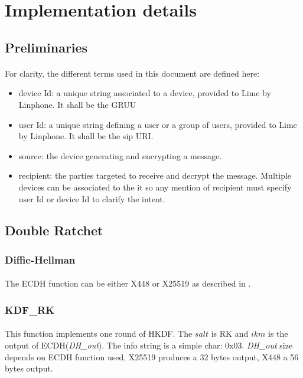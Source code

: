 \documentclass[a4paper,11pt]{article}
\begin{document}
\section{Implementation details}
  \subsection{Preliminaries}
    \paragraph{}For clarity, the different terms used in this document are defined here:
    \begin{itemize}
      \item device Id: a unique string associated to a device, provided to Lime by Linphone. It shall be the GRUU\cite{rfc5627}
      \item user Id: a unique string defining a user or a group of users, provided to Lime by Linphone. It shall be the sip URI.
      \item source: the device generating and encrypting a message.
      \item recipient: the parties targeted to receive and decrypt the message. Multiple devices can be associated to the it so any mention of recipient must specify user Id or device Id to clarify the intent.
    \end{itemize}

  \subsection{Double Ratchet}
    \subsubsection{Diffie-Hellman}
      \paragraph{}The ECDH function can be either X448 or X25519 as described in \cite{rfc7748}.
    \subsubsection{KDF\_RK}
      \paragraph*{}This function implements one round of HKDF\cite{rfc5869}. The $salt$ is RK and $ikm$ is the output of ECDH(\textit{DH\_out}). The info string is a simple char: 0x03. \textit{DH\_out} size depends on ECDH function used, X25519 produces a 32 bytes output, X448 a 56 bytes output. 
\end{document}
